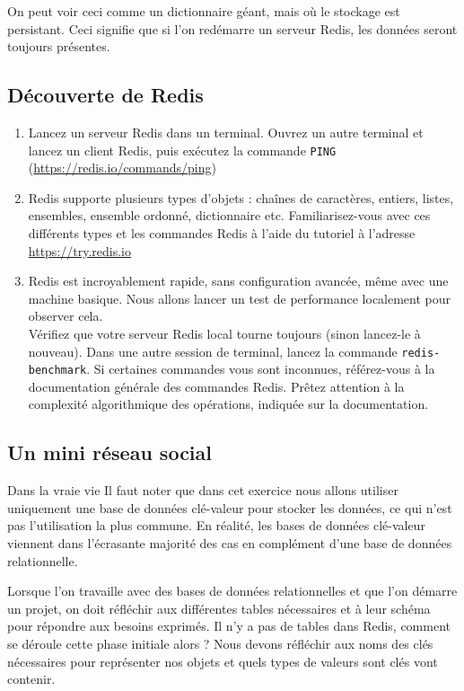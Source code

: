 \documentclass[a4paper,10pt]{article}
\begin{document}
  On peut voir ceci comme un dictionnaire géant, mais où le stockage est persistant. Ceci signifie que si l'on redémarre un serveur Redis, les données seront toujours présentes.
  \subsection{Découverte de Redis}
    \begin{enumerate}
      \item Lancez un serveur Redis dans un terminal. Ouvrez un autre terminal et lancez un client Redis, puis exécutez la commande \texttt{PING} (\url{https://redis.io/commands/ping})
      \item Redis supporte plusieurs types d'objets : chaînes de caractères, entiers, listes, ensembles, ensemble ordonné, dictionnaire etc. Familiarisez-vous avec ces différents types et les commandes Redis à l'aide du tutoriel à l'adresse \url{https://try.redis.io}
      \item Redis est incroyablement rapide, sans configuration avancée, même avec une machine basique. Nous allons lancer un test de performance localement pour observer cela.\\

      Vérifiez que votre serveur Redis local tourne toujours (sinon lancez-le à nouveau). Dans une autre session de terminal, lancez la commande \texttt{redis-benchmark}. Si certaines commandes vous sont inconnues, référez-vous à la documentation générale des commandes Redis. Prêtez attention à la complexité algorithmique des opérations, indiquée sur la documentation.
    \end{enumerate}

  \subsection{Un mini réseau social}
    \begin{bclogo}[logo = \bcinfo, arrondi = 0.1, ombre = true , epOmbre = 0.1, couleurOmbre = black!30,  barre =none, couleurBarre=bleuF]{Dans la vraie vie}
      Il faut noter que dans cet exercice nous allons utiliser uniquement une base de données clé-valeur pour stocker les données, ce qui n'est pas l'utilisation la plus commune. En réalité, les bases de données clé-valeur viennent dans l'écrasante majorité des cas en complément d'une base de données relationnelle.
    \end{bclogo}
    Lorsque l'on travaille avec des bases de données relationnelles et que l'on démarre un projet, on doit réfléchir aux différentes tables nécessaires et à leur schéma pour répondre aux besoins exprimés. Il n'y a pas de tables dans Redis, comment se déroule cette phase initiale alors ? Nous devons réfléchir aux noms des clés nécessaires pour représenter nos objets et quels types de valeurs sont clés vont contenir.
\end{document}
